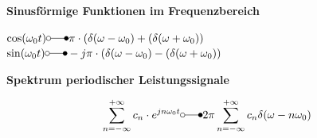 	\begin{minipage}[t]{9cm}
		\textbf{Sinusf\"ormige Funktionen im Frequenzbereich}\\ 
			\hspace*{0.5cm}
			\parbox{8cm}{
				$\cos(\omega_0t) \laplace \pi \cdot (\delta(\omega - \omega_0)+ (\delta(\omega + \omega_0))$\\
				$\sin(\omega_0t) \laplace -j\pi \cdot (\delta(\omega - \omega_0)- (\delta(\omega + \omega_0))$	
			}
	\end{minipage}
	\begin{minipage}[t]{9cm}
		\textbf{Spektrum periodischer Leistungssignale}\\ 
			\hspace*{0.5cm}
			\parbox[b][1.2cm][c]{8cm}{
				$$\sum_{n = -\infty}^{+\infty} c_n \cdot e^{jn\omega_0t} \laplace 2\pi \sum_{n = -\infty}^{+\infty} c_n\delta(\omega - n\omega_0)$$		
			}
	\end{minipage}